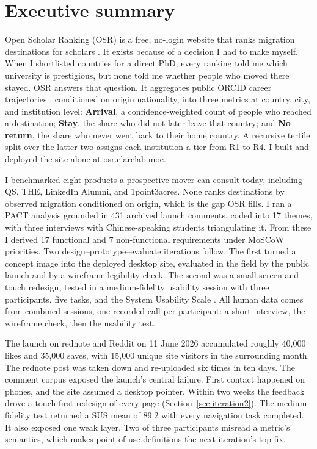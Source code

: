 \section{Executive summary}

Open Scholar Ranking (OSR) is a free, no-login website that ranks migration destinations for scholars \cite{osr}. It exists because of a decision I had to make myself. When I shortlisted countries for a direct PhD, every ranking told me which university is prestigious, but none told me whether people who moved there stayed. OSR answers that question. It aggregates public ORCID career trajectories \cite{orcid2025}, conditioned on origin nationality, into three metrics at country, city, and institution level: \textbf{Arrival}, a confidence-weighted count of people who reached a destination; \textbf{Stay}, the share who did not later leave that country; and \textbf{No return}, the share who never went back to their home country. A recursive tertile split over the latter two assigns each institution a tier from R1 to R4. I built and deployed the site alone at osr.clarelab.moe.

I benchmarked eight products a prospective mover can consult today, including QS, THE, LinkedIn Alumni, and 1point3acres. None ranks destinations by observed migration conditioned on origin, which is the gap OSR fills. I ran a PACT analysis grounded in 431 archived launch comments, coded into 17 themes, with three interviews with Chinese-speaking students triangulating it. From these I derived 17 functional and 7 non-functional requirements under MoSCoW priorities. Two design--prototype--evaluate iterations follow. The first turned a concept image into the deployed desktop site, evaluated in the field by the public launch and by a wireframe legibility check. The second was a small-screen and touch redesign, tested in a medium-fidelity usability session with three participants, five tasks, and the System Usability Scale \cite{brooke1996sus}. All human data comes from combined sessions, one recorded call per participant: a short interview, the wireframe check, then the usability test.

The launch on rednote and Reddit on 11 June 2026 accumulated roughly 40{,}000 likes and 35{,}000 saves, with 15{,}000 unique site visitors in the surrounding month. The rednote post was taken down and re-uploaded six times in ten days. The comment corpus exposed the launch's central failure. First contact happened on phones, and the site assumed a desktop pointer. Within two weeks the feedback drove a touch-first redesign of every page (Section~\ref{sec:iteration2}). The medium-fidelity test returned a SUS mean of 89.2 with every navigation task completed. It also exposed one weak layer. Two of three participants misread a metric's semantics, which makes point-of-use definitions the next iteration's top fix.

